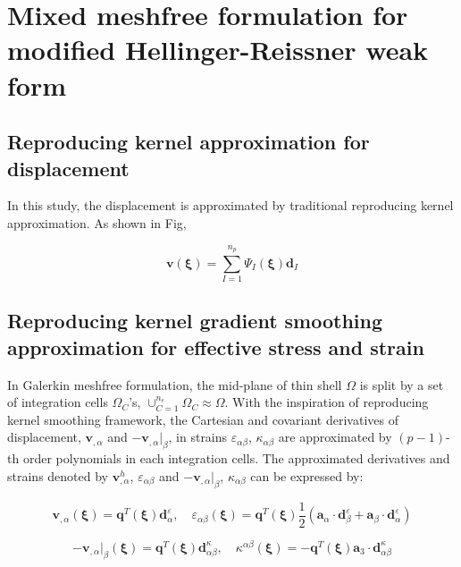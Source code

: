 \section{Mixed meshfree formulation for modified Hellinger-Reissner weak form}
\subsection{Reproducing kernel approximation for displacement}
In this study, the displacement is approximated by traditional reproducing kernel approximation. As shown in Fig, 

\begin{equation}
\boldsymbol v(\boldsymbol \xi) = \sum_{I=1}^{n_p} \Psi_I(\boldsymbol \xi) \boldsymbol d_I
\end{equation}

\subsection{Reproducing kernel gradient smoothing approximation for effective stress and strain}
In Galerkin meshfree formulation, the mid-plane of thin shell $\Omega$ is split by a set of integration cells $\Omega_C$'s, $\cup_{C=1}^{n_e}\Omega_C\approx \Omega$. With the inspiration of reproducing kernel smoothing framework, the Cartesian and covariant derivatives of displacement, $\boldsymbol v_{,\alpha}$ and $-\boldsymbol v_{,\alpha}\vert_\beta$, in strains $\varepsilon_{\alpha\beta}$, $\kappa_{\alpha\beta}$ are approximated by $(p-1)$-th order polynomials in each integration cells. The approximated derivatives and strains denoted by $\boldsymbol v^h_{,\alpha}$, $\varepsilon_{\alpha\beta}$ and $-\boldsymbol v_{,\alpha}\vert_\beta$, $\kappa_{\alpha\beta}$ can be expressed by:

\begin{equation}
    \boldsymbol v_{,\alpha}(\boldsymbol \xi) = \boldsymbol q^T(\boldsymbol \xi) \boldsymbol d_{\alpha}^\varepsilon, \quad
    \varepsilon_{\alpha\beta}(\boldsymbol \xi) = \boldsymbol q^T(\boldsymbol \xi) \frac{1}{2}(\boldsymbol a_\alpha \cdot \boldsymbol d_{\beta}^\varepsilon + \boldsymbol a_\beta \cdot \boldsymbol d_{\alpha}^\varepsilon)
\end{equation}

\begin{equation}
    -\boldsymbol v_{,\alpha}\vert_\beta(\boldsymbol \xi) = \boldsymbol q^T(\boldsymbol \xi) \boldsymbol d_{\alpha\beta}^\kappa , \quad
    \kappa^{\alpha\beta}(\boldsymbol \xi) = - \boldsymbol q^T(\boldsymbol \xi) \boldsymbol a_3 \cdot \boldsymbol d_{\alpha\beta}^\kappa
\end{equation}

